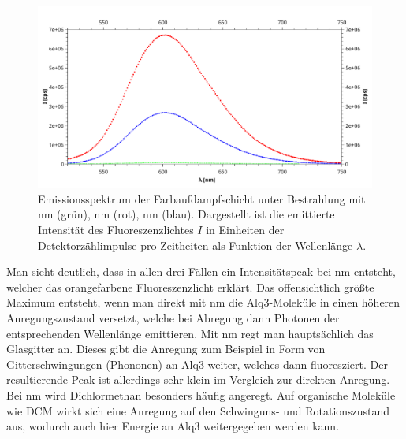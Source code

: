 		\begin{figure}[htb]
			\centering
			\includegraphics[width=0.75\linewidth]{pic/flouromax_emission.pdf}
			\caption{Emissionsspektrum der Farbaufdampfschicht unter Bestrahlung mit \unit[280]{nm} (grün), \unit[400]{nm} (rot), \unit[500]{nm} (blau). Dargestellt ist die emittierte Intensität des Fluoreszenzlichtes $I$ in Einheiten der Detektorzählimpulse pro Zeitheiten als Funktion der Wellenlänge $\lambda$.}
			\label{fig:flouromax_emission}
		\end{figure}
		Man sieht deutlich, dass in allen drei Fällen ein Intensitätspeak bei \unit[600]{nm} entsteht, welcher das orangefarbene Fluoreszenzlicht erklärt. Das offensichtlich größte Maximum entsteht, wenn man direkt mit \unit[400]{nm} die Alq3-Moleküle in einen höheren Anregungszustand versetzt, welche bei Abregung dann Photonen der entsprechenden Wellenlänge emittieren. Mit \unit[280]{nm} regt man hauptsächlich das Glasgitter an. Dieses gibt die Anregung zum Beispiel in Form von Gitterschwingungen (Phononen) an Alq3 weiter, welches dann fluoresziert. Der resultierende Peak ist allerdings sehr klein im Vergleich zur direkten Anregung. Bei \unit[500]{nm} wird Dichlormethan besonders häufig angeregt. Auf organische Moleküle wie DCM wirkt sich eine Anregung auf den Schwinguns- und Rotationszustand aus, wodurch auch hier Energie an Alq3 weitergegeben werden kann. 